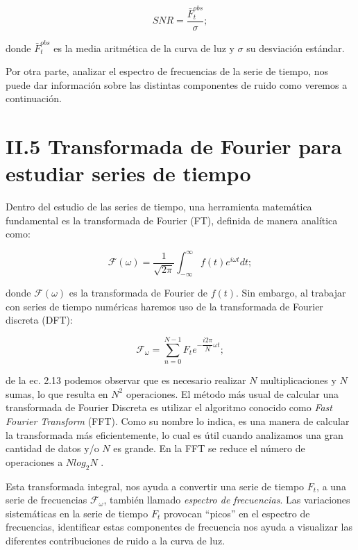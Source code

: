 \begin{equation}
  \displaystyle SNR=\dfrac{\bar{F}^{obs}_{t}}{\sigma};
\end{equation}

\noindent donde $\bar{F}^{obs}_{t}$ es la media aritmética de la curva de luz y $\sigma$ su desviación estándar.

Por otra parte, analizar el espectro de frecuencias de la serie de tiempo, nos puede dar información sobre las distintas componentes de ruido como veremos a continuación.

\section*{II.5 Transformada de Fourier para estudiar series de tiempo}

Dentro del estudio de las series de tiempo, una herramienta matemática fundamental es la transformada de Fourier (FT), definida de manera analítica como:

\begin{equation}
  \displaystyle \mathcal{F}(\omega )=\frac{1}{\sqrt{2\pi}}\int_{-\infty}^{\infty} f(t)e^{i\omega t}dt;
\end{equation}

\noindent donde $\mathcal{F}(\omega )$ es la transformada de Fourier de $f(t)$. Sin embargo, al trabajar con series de tiempo numéricas haremos uso de la transformada de Fourier discreta (DFT):  

\begin{equation}
  \displaystyle \mathcal{F}_{\omega}= \sum_{n=0}^{N-1} F_{t}e^{-\dfrac{i2\pi}{N}\omega t};
\end{equation}

\noindent de la ec. 2.13 podemos observar que es necesario realizar $N$ multiplicaciones y $N$ sumas, lo que resulta en $N^{2}$ operaciones. El método más usual de calcular una transformada de Fourier Discreta es utilizar el algoritmo conocido como \textit{Fast Fourier Transform} (FFT). Como su nombre lo indica, es una manera de calcular la transformada más eficientemente, lo cual es útil cuando analizamos una gran cantidad de datos y/o $N$ es grande. En la FFT se reduce el número de operaciones a $Nlog_{2}N$ \citep{cooley1965algorithm}. 

Esta transformada integral, nos ayuda a convertir una serie de tiempo $F_{t}$, a una serie de frecuencias $\mathcal{F}_{\omega}$, también llamado \textit{espectro de frecuencias}. Las variaciones sistemáticas en la serie de tiempo $F_{t}$ provocan ``picos'' en el espectro de frecuencias, identificar estas componentes de frecuencia nos ayuda a visualizar las diferentes contribuciones de ruido a la curva de luz.

